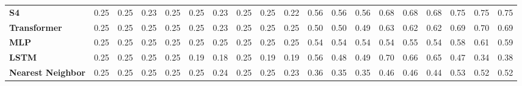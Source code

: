 \begin{table}[t]
{\begin{tabular}{l ccc ccc ccc ccc ccc ccc}
\textbf{S4} & \cellcolor[HTML]{FF6C6B}0.25 & \cellcolor[HTML]{FF6C6B}0.25 & \cellcolor[HTML]{FF6B6B}0.23 & \cellcolor[HTML]{FF6B6B}0.25 & \cellcolor[HTML]{FF6B6B}0.25 & \cellcolor[HTML]{FF6B6B}0.23 & \cellcolor[HTML]{FF6C6A}0.25 & \cellcolor[HTML]{FF6D6A}0.25 & \cellcolor[HTML]{FF6B6B}0.22 & \cellcolor[HTML]{D5D345}0.56 & \cellcolor[HTML]{D8D345}0.56 & \cellcolor[HTML]{D9D344}0.56 & \cellcolor[HTML]{7FD05B}0.68 & \cellcolor[HTML]{84D05A}0.68 & \cellcolor[HTML]{82D05A}0.68 & \cellcolor[HTML]{53CF65}0.75 & \cellcolor[HTML]{52CF66}0.75 & \cellcolor[HTML]{53CF66}0.75 \\
\textbf{Transformer} & \cellcolor[HTML]{FF6B6B}0.25 & \cellcolor[HTML]{FF6B6B}0.25 & \cellcolor[HTML]{FF6B6B}0.25 & \cellcolor[HTML]{FF6B6B}0.25 & \cellcolor[HTML]{FF6B6B}0.25 & \cellcolor[HTML]{FF6B6B}0.23 & \cellcolor[HTML]{FF6B6B}0.25 & \cellcolor[HTML]{FF6B6B}0.25 & \cellcolor[HTML]{FF6B6B}0.25 & \cellcolor[HTML]{FDD43C}0.50 & \cellcolor[HTML]{FFD33C}0.50 & \cellcolor[HTML]{FFD13C}0.49 & \cellcolor[HTML]{A6D151}0.63 & \cellcolor[HTML]{ABD250}0.62 & \cellcolor[HTML]{AAD250}0.62 & \cellcolor[HTML]{79D05C}0.69 & \cellcolor[HTML]{74D05D}0.70 & \cellcolor[HTML]{77D05D}0.69 \\
\textbf{MLP} & \cellcolor[HTML]{FF6B6B}0.25 & \cellcolor[HTML]{FF6B6B}0.25 & \cellcolor[HTML]{FF6B6B}0.25 & \cellcolor[HTML]{FF6C6B}0.25 & \cellcolor[HTML]{FF6C6B}0.25 & \cellcolor[HTML]{FF6B6B}0.25 & \cellcolor[HTML]{FF6B6B}0.25 & \cellcolor[HTML]{FF6B6B}0.25 & \cellcolor[HTML]{FF6B6B}0.25 & \cellcolor[HTML]{E5D341}0.54 & \cellcolor[HTML]{E6D341}0.54 & \cellcolor[HTML]{E7D341}0.54 & \cellcolor[HTML]{E6D341}0.54 & \cellcolor[HTML]{DFD343}0.55 & \cellcolor[HTML]{E3D342}0.54 & \cellcolor[HTML]{C5D249}0.58 & \cellcolor[HTML]{B3D24E}0.61 & \cellcolor[HTML]{BFD24B}0.59 \\
\textbf{LSTM} & \cellcolor[HTML]{FF6B6B}0.25 & \cellcolor[HTML]{FF6B6B}0.25 & \cellcolor[HTML]{FF6B6B}0.25 & \cellcolor[HTML]{FF6B6B}0.25 & \cellcolor[HTML]{FF6B6B}0.19 & \cellcolor[HTML]{FF6B6B}0.18 & \cellcolor[HTML]{FF6B6B}0.25 & \cellcolor[HTML]{FF6B6B}0.19 & \cellcolor[HTML]{FF6B6B}0.19 & \cellcolor[HTML]{D2D346}0.56 & \cellcolor[HTML]{FFCC3F}0.48 & \cellcolor[HTML]{FFD13C}0.49 & \cellcolor[HTML]{77D05D}0.70 & \cellcolor[HTML]{8ED157}0.66 & \cellcolor[HTML]{99D154}0.65 & \cellcolor[HTML]{FFC841}0.47 & \cellcolor[HTML]{FF9259}0.34 & \cellcolor[HTML]{FFA053}0.38 \\
\textbf{Nearest Neighbor} & \cellcolor[HTML]{FF6B6B}0.25 & \cellcolor[HTML]{FF6B6B}0.25 & \cellcolor[HTML]{FF6B6B}0.25 & \cellcolor[HTML]{FF6C6A}0.25 & \cellcolor[HTML]{FF6C6A}0.25 & \cellcolor[HTML]{FF6B6B}0.24 & \cellcolor[HTML]{FF6C6A}0.25 & \cellcolor[HTML]{FF6B6B}0.25 & \cellcolor[HTML]{FF6B6B}0.23 & \cellcolor[HTML]{FF9A56}0.36 & \cellcolor[HTML]{FF9558}0.35 & \cellcolor[HTML]{FF9657}0.35 & \cellcolor[HTML]{FFC243}0.46 & \cellcolor[HTML]{FFC243}0.46 & \cellcolor[HTML]{FFBC46}0.44 & \cellcolor[HTML]{E9D340}0.53 & \cellcolor[HTML]{F4D43E}0.52 & \cellcolor[HTML]{F3D43E}0.52 \\

\end{tabular}}
\end{table}
